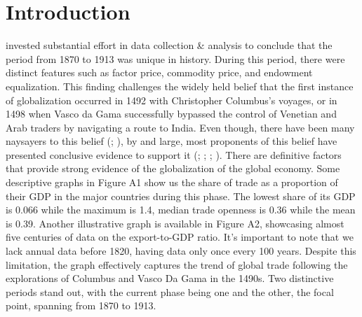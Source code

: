 \documentclass[10pt]{article}
\begin{document}
\section{Introduction}
\citet{ORourke2002} invested substantial effort in data collection \& analysis to conclude that the period from 1870 to 1913 was unique in history. During this period, there were distinct features such as factor price, commodity price, and endowment equalization. This finding challenges the widely held belief that the first instance of globalization occurred in 1492 with Christopher Columbus's voyages, or in 1498 when Vasco da Gama successfully bypassed the control of Venetian and Arab traders by navigating a route to India. Even though, there have been many naysayers to this belief (\citet{Frank1998}; \citet{FlynnGiraldez2004}), by and large, most proponents of this belief have presented conclusive evidence to support it (\citet{Estevadeordal2003}; \citet{KlasingMilionis2014}; \citet{JacksMeissnerNovy2011}; \citet{Jacks2005}). There are definitive factors that provide strong evidence of the globalization of the global economy. Some descriptive graphs in Figure A1 show us the share of trade as a proportion of their GDP in the major countries during this phase. The lowest share of its GDP is 0.066 while the maximum is 1.4, median trade openness is 0.36 while the mean is 0.39. Another illustrative graph is available in Figure A2, showcasing almost five centuries of data on the export-to-GDP ratio. It's important to note that we lack annual data before 1820, having data only once every 100 years. Despite this limitation, the graph effectively captures the trend of global trade following the explorations of Columbus and Vasco Da Gama in the 1490s. Two distinctive periods stand out, with the current phase being one and the other, the focal point, spanning from 1870 to 1913.
\end{document}
